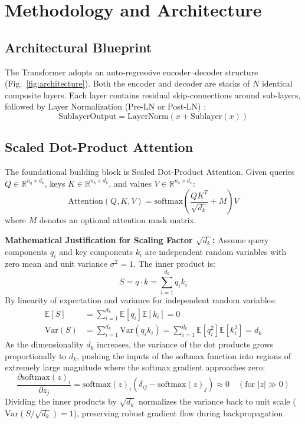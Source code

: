 \documentclass[conference]{IEEEtran}
\begin{document}
\section{Methodology and Architecture}

\subsection{Architectural Blueprint}
The Transformer adopts an auto-regressive encoder--decoder structure (Fig.~\ref{fig:architecture}). Both the encoder and decoder are stacks of $N$ identical composite layers. Each layer contains residual skip-connections around sub-layers, followed by Layer Normalization (Pre-LN or Post-LN) \cite{ba2016layer}:
\begin{equation}
\text{SublayerOutput} = \text{LayerNorm}(x + \text{Sublayer}(x))
\end{equation}

\subsection{Scaled Dot-Product Attention}
The foundational building block is Scaled Dot-Product Attention. Given queries $Q \in \mathbb{R}^{n_q \times d_k}$, keys $K \in \mathbb{R}^{n_k \times d_k}$, and values $V \in \mathbb{R}^{n_k \times d_v}$:
\begin{equation}
\text{Attention}(Q, K, V) = \text{softmax}\left(\frac{QK^T}{\sqrt{d_k}} + M\right) V
\label{eq:attention}
\end{equation}
where $M$ denotes an optional attention mask matrix.

\textbf{Mathematical Justification for Scaling Factor $\sqrt{d_k}$:}
Assume query components $q_i$ and key components $k_i$ are independent random variables with zero mean and unit variance $\sigma^2 = 1$. The inner product is:
\begin{equation}
S = q \cdot k = \sum_{i=1}^{d_k} q_i k_i
\end{equation}
By linearity of expectation and variance for independent random variables:
\begin{align}
\mathbb{E}[S] &= \sum_{i=1}^{d_k} \mathbb{E}[q_i]\mathbb{E}[k_i] = 0 \\
\text{Var}(S) &= \sum_{i=1}^{d_k} \text{Var}(q_i k_i) = \sum_{i=1}^{d_k} \mathbb{E}[q_i^2]\mathbb{E}[k_i^2] = d_k
\end{align}
As the dimensionality $d_k$ increases, the variance of the dot products grows proportionally to $d_k$, pushing the inputs of the softmax function into regions of extremely large magnitude where the softmax gradient approaches zero:
\begin{equation}
\frac{\partial \text{softmax}(z)_i}{\partial z_j} = \text{softmax}(z)_i (\delta_{ij} - \text{softmax}(z)_j) \approx 0 \quad (\text{for } |z| \gg 0)
\end{equation}
Dividing the inner products by $\sqrt{d_k}$ normalizes the variance back to unit scale ($\text{Var}(S / \sqrt{d_k}) = 1$), preserving robust gradient flow during backpropagation.
\end{document}

